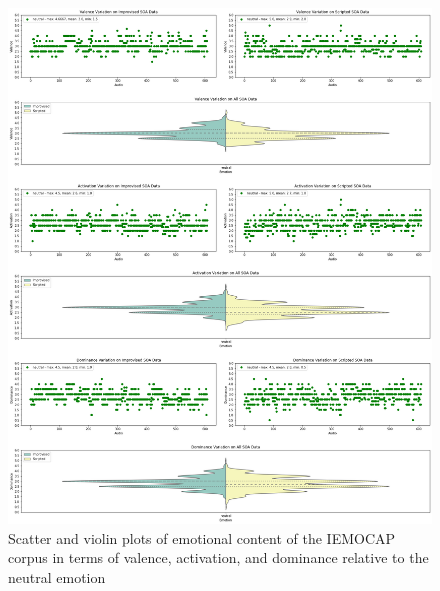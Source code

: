 \begin{figure}[H]
	\centering
	\includegraphics[width=1\linewidth]{figs/appendix/IEMOCAP_data_study/neutralScatterViolins.png}
	\caption{Scatter and violin plots of emotional content of the IEMOCAP corpus in terms of valence, activation, and dominance relative to the neutral emotion}
	\label{fig:neutralScatterViolins}
\end{figure}


